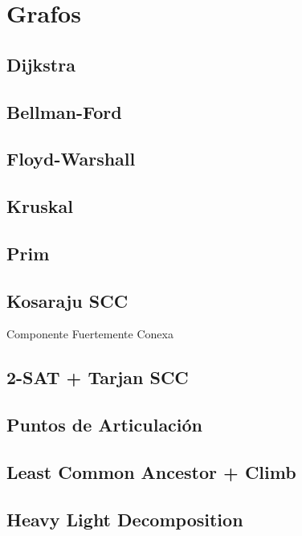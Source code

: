 \newpage
\section{Grafos}
\subsection{Dijkstra}

\subsection{Bellman-Ford}

\subsection{Floyd-Warshall}

\subsection{Kruskal}

\subsection{Prim}

\subsection{Kosaraju SCC}
Componente Fuertemente Conexa

\subsection{2-SAT + Tarjan SCC}

\subsection{Puntos de Articulaci\'on}

\subsection{Least Common Ancestor + Climb}

\subsection{Heavy Light Decomposition}

